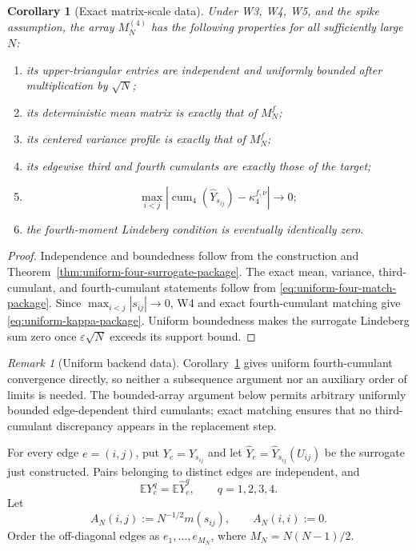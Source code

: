 \documentclass[11pt]{article}
\newtheorem{corollary}[theorem]{Corollary}
\theoremstyle{definition}
\theoremstyle{remark}
\newtheorem{remark}[theorem]{Remark}
\newcommand{\E}{\mathbb E}
\newcommand{\cum}{\operatorname{cum}}
\begin{document}
\begin{corollary}[Exact matrix-scale data]
\label{cor:atomic-array-data-package}
Under W3, W4, W5, and the spike assumption, the array
\(M_N^{(4)}\) has the following properties for all sufficiently large \(N\):
\begin{enumerate}[label=(A\arabic*)]
\item its upper-triangular entries are independent and uniformly bounded after
      multiplication by \(\sqrt N\);
\item its deterministic mean matrix is exactly that of \(M_N^f\);
\item its centered variance profile is exactly that of \(M_N^f\);
\item its edgewise third and fourth cumulants are exactly those of the target;
\item
\begin{equation}\label{eq:uniform-kappa-package}
 \max_{i<j}
 \left|
 \cum_4(\widehat Y_{s_{ij}})-\kappa_4^{f,\nu}
 \right|\longrightarrow0;
\end{equation}
\item the fourth-moment Lindeberg condition is eventually identically zero.
\end{enumerate}
\end{corollary}

\begin{proof}
Independence and boundedness follow from the construction and
Theorem~\ref{thm:uniform-four-surrogate-package}.  The exact mean, variance,
third-cumulant, and fourth-cumulant statements follow from
\eqref{eq:uniform-four-match-package}.  Since
\(\max_{i<j}|s_{ij}|\to0\), W4 and exact fourth-cumulant matching give
\eqref{eq:uniform-kappa-package}.  Uniform boundedness makes the surrogate
Lindeberg sum zero once \(\varepsilon\sqrt N\) exceeds its support bound.
\end{proof}

\begin{remark}[Uniform backend data]
Corollary~\ref{cor:atomic-array-data-package} gives uniform fourth-cumulant
convergence directly, so neither a subsequence argument nor an auxiliary
order of limits is needed.  The bounded-array argument below permits arbitrary
uniformly bounded edge-dependent third cumulants; exact matching ensures that
no third-cumulant discrepancy appears in the replacement step.
\end{remark}

For every edge $e=(i,j)$, put $Y_e=Y_{s_{ij}}$ and let
$\widehat Y_e=\widehat Y_{s_{ij}}(U_{ij})$ be the surrogate just constructed.
Pairs belonging to distinct edges are independent, and
\begin{equation}\label{eq:edge-four-match-package}
 \E Y_e^q=\E\widehat Y_e^q,
 \qquad q=1,2,3,4.
\end{equation}
Let
\begin{equation}\label{eq:mean-matrix-package}
 A_N(i,j):=N^{-1/2}m(s_{ij}),
 \qquad A_N(i,i):=0.
\end{equation}
Order the off-diagonal edges as $e_1,\ldots,e_{M_N}$, where
$M_N=N(N-1)/2$.
\end{document}
